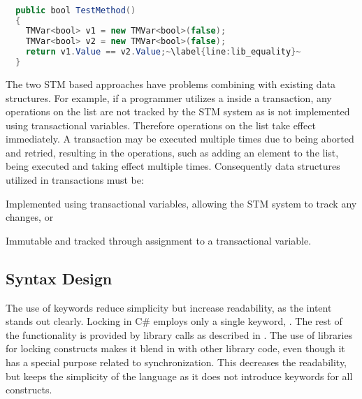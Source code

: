 \begin{lstlisting}[float, label=lst:lib_implicit_conversion,
  caption={Equality comparison of \bscode{TMVar<bool>}},
  language=Java,  
  showspaces=false,
  showtabs=false,
  breaklines=true,
  showstringspaces=false,
  breakatwhitespace=true,
  escapechar=~,
  commentstyle=\color{greencomments},
  keywordstyle=\color{bluekeywords},
  stringstyle=\color{redstrings},
  morekeywords={atomic, retry, orelse, var, get, set, ref, out, bool}]  % Start your code-block

  public bool TestMethod()
  {
    TMVar<bool> v1 = new TMVar<bool>(false);
    TMVar<bool> v2 = new TMVar<bool>(false);
    return v1.Value == v2.Value;~\label{line:lib_equality}~
  }
\end{lstlisting}

The two \ac{STM} based approaches have problems combining with existing data structures. For example, if a programmer utilizes a  inside a transaction, any operations on the list are not tracked by the \ac{STM} system as  is not implemented using transactional variables. Therefore operations on the list take effect immediately. A transaction may be executed multiple times due to being aborted and retried, resulting in the operations, such as adding an element to the list, being executed and taking effect multiple times. Consequently data structures utilized in transactions must be: \begin{inparaenum}
 \item Implemented using transactional variables, allowing the \ac{STM} system to track any changes, or
 \item Immutable and tracked through assignment to a transactional variable.
\end{inparaenum} 

\subsection{Syntax Design}\label{subsec:syntaxdesign}
The use of keywords reduce simplicity but increase readability, as the intent stands out clearly\cite[p. 12-13]{sebestaProLang}. Locking in C\# employs only a single keyword, . The rest of the functionality is provided by library calls as described in . The use of libraries for locking constructs makes it blend in with other library code, even though it has a special purpose related to synchronization. This decreases the readability, but keeps the simplicity of the language as it does not introduce keywords for all constructs.

